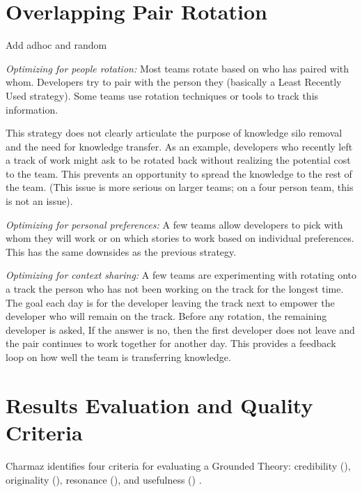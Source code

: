 \section{Overlapping Pair Rotation}
\label{OverlappingPairRotation}

Add adhoc and random

\textit{Optimizing for people rotation:} Most teams rotate based on who has paired with whom. Developers try to pair with the person they  (basically a Least Recently Used strategy). Some teams use rotation techniques or tools to track this information.

This strategy does not clearly articulate the purpose of knowledge silo removal and the need for knowledge transfer. As an example, developers who recently left a track of work might ask to be rotated back without realizing the potential cost to the team. This prevents an opportunity to spread the knowledge to the rest of the team. (This issue is more serious on larger teams; on a four person team, this is not an issue).

\textit{Optimizing for personal preferences:} A few teams allow developers to pick with whom they will work or on which stories to work based on individual preferences. This has the same downsides as the previous strategy. 

\textit{Optimizing for context sharing:} A few teams are experimenting with rotating onto a track the person who has not been working on the track for the longest time. The goal each day is for the developer leaving the track next to empower the developer who will remain on the track. Before any rotation, the remaining developer is asked,  If the answer is no, then the first developer does not leave and the pair continues to work together for another day. This provides a feedback loop on how well the team is transferring knowledge. 


\section{Results Evaluation and Quality Criteria}
\label{ResultsEvaluation}

Charmaz identifies four criteria for evaluating a Grounded Theory: credibility (), originality (), resonance (), and usefulness () \cite{StolGroundedTheory}. 

